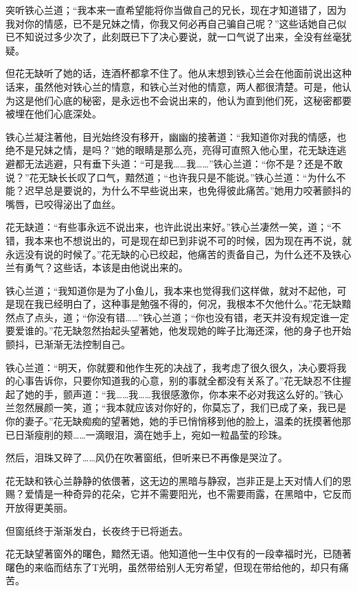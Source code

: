 \documentclass[12pt,oneside]{book}
\begin{document}
突听铁心兰道；``我本来一直希望能将你当做自己的兄长，现在才知道错了，因为我对你的情感，已不是兄妹之情，你我又何必再自己骗自己呢？''这些话她自己似已不知说过多少次了，此刻既已下了决心要说，就一口气说了出来，全没有丝毫犹疑。

但花无缺听了她的话，连酒杯都拿不住了。他从末想到铁心兰会在他面前说出这种话来，虽然他对铁心兰的情意，和铁心兰对他的情意，两人都很清楚。可是，他认为这是他们心底的秘密，是永远也不会说出来的，他认为直到他们死，这秘密都要被埋在他们心底深处。

铁心兰凝注著他，目光始终没有移开，幽幽的接著道：``我知道你对我的情感，也绝不是兄妹之情，是吗？''她的眼睛是那么亮，亮得可直照入他心里，花无缺连逃避都无法逃避，只有垂下头道：``可是我\ldots\ldots 我\ldots\ldots{}''铁心兰道：``你不是？还是不敢说？''花无缺长长叹了口气，黯然道；``也许我只是不能说。''铁心兰道：``为什么不能？迟早总是要说的，为什么不早些说出来，也免得彼此痛苦。''她用力咬著颤抖的嘴唇，已咬得泌出了血丝。

花无缺道：``有些事永远不说出来，也许此说出来好。''铁心兰凄然一笑，道；``不错，我本来也不想说出的，可是现在却已到非说不可的时候，因为现在再不说，就永远没有说的时候了。''花无缺的心已绞起，他痛苦的责备自己，为什么还不及铁心兰有勇气？这些话，本该是由他说出来的。

铁心兰道；``我知道你是为了小鱼儿，我本来也觉得我们这样做，就对不起他，可是现在我已经明白了，这种事是勉强不得的，何况，我根本不欠他什么。''花无缺黯然点了点头，道；``你没有错\ldots\ldots{}''铁心兰道；``你也没有错，老天并没有规定谁一定要爱谁的。''花无缺忽然抬起头望著她，他发现她的眸子比海还深，他的身子也开始颤抖，已渐渐无法控制自己。

铁心兰道：``明天，你就要和他作生死的决战了，我考虑了很久很久，决心要将我的心事告诉你，只要你知道我的心意，别的事就全都没有关系了。''花无缺忍不住握起了她的手，颤声道：``我\ldots\ldots 我\ldots\ldots 我很感激你，你本来不必对我这么好的。''铁心兰忽然展颜一笑，道；``我本就应该对你好的，你莫忘了，我们已成了亲，我已是你的妻子。''花无缺痴痴的望著她，她的手已悄悄移到他的脸上，温柔的抚摸著他那已日渐瘦削的颊\ldots\ldots 一滴眼泪，滴在她手上，宛如一粒晶莹的珍珠。

然后，泪珠又碎了\ldots\ldots 风仍在吹著窗纸，但听来已不再像是哭泣了。

花无缺和铁心兰静静的依偎著，这无边的黑暗与静寂，岂非正是上天对情人们的恩赐？爱情是一种奇异的花朵，它并不需要阳光，也不需要雨露，在黑暗中，它反而开放得更美丽。

但窗纸终于渐渐发白，长夜终于已将逝去。

花无缺望著窗外的曙色，黯然无语。他知道他一生中仅有的一段幸福时光，已随著曙色的来临而结东了T光明，虽然带给别人无穷希望，但现在带给他的，却只有痛苦。
\end{document}
